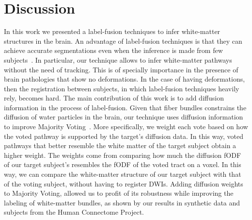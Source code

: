 \section{Discussion}
In this work we presented a label-fusion techniques to infer white-matter
structures in the brain. An advantage of label-fusion techniques is that
they can achieve accurate segmentations even when the inference is
made from few subjects~\cite{Asman2013}. In particular, our technique allows to
infer white-matter pathways without the need of tracking. This is of specially
importance in the presence of brain pathologies that show no deformations. In the case of having
deformations, then the registration between subjects, in which label-fusion
techniques heavily rely, becomes hard. The main contribution of this work
is to add diffusion information in the process of label-fusion. Given that fiber
bundles constrains the diffusion of
water particles in the brain, our technique uses diffusion information to improve
Majority Voting~\cite{Xu1992}. More specifically, we weight each vote based on how
the voted pathway is supported by the target's diffusion data. In this way, voted
pathways that better resemble the white matter of the target subject obtain a 
higher weight. The weights come from comparing how much the diffusion fODF of our
target subject's resembles the fODF of the voted tract on a voxel. In this way, we
can compare the white-matter structure of our target subject with that of the voting
subject, without having to register DWIs. Adding diffusion weights to Majority Voting,
allowed us to profit of its robustness while improving the labeling of white-matter
bundles, as shown by our results in synthetic data and subjects from the Human
Connectome Project.

